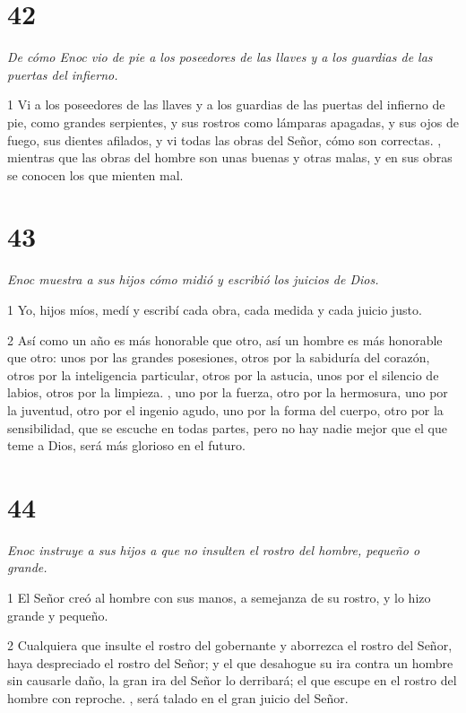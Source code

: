 \chapter{42}

\par \textit{De cómo Enoc vio de pie a los poseedores de las llaves y a los guardias de las puertas del infierno.}

\par 1 Vi a los poseedores de las llaves y a los guardias de las puertas del infierno de pie, como grandes serpientes, y sus rostros como lámparas apagadas, y sus ojos de fuego, sus dientes afilados, y vi todas las obras del Señor, cómo son correctas. , mientras que las obras del hombre son unas buenas y otras malas, y en sus obras se conocen los que mienten mal.

\chapter{43}

\par \textit{Enoc muestra a sus hijos cómo midió y escribió los juicios de Dios.}

\par 1 Yo, hijos míos, medí y escribí cada obra, cada medida y cada juicio justo.

\par 2 Así como un año es más honorable que otro, así un hombre es más honorable que otro: unos por las grandes posesiones, otros por la sabiduría del corazón, otros por la inteligencia particular, otros por la astucia, unos por el silencio de labios, otros por la limpieza. , uno por la fuerza, otro por la hermosura, uno por la juventud, otro por el ingenio agudo, uno por la forma del cuerpo, otro por la sensibilidad, que se escuche en todas partes, pero no hay nadie mejor que el que teme a Dios, será más glorioso en el futuro.

\chapter{44}

\par \textit{Enoc instruye a sus hijos a que no insulten el rostro del hombre, pequeño o grande.}

\par 1 El Señor creó al hombre con sus manos, a semejanza de su rostro, y lo hizo grande y pequeño.

\par 2 Cualquiera que insulte el rostro del gobernante y aborrezca el rostro del Señor, haya despreciado el rostro del Señor; y el que desahogue su ira contra un hombre sin causarle daño, la gran ira del Señor lo derribará; el que escupe en el rostro del hombre con reproche. , será talado en el gran juicio del Señor.

